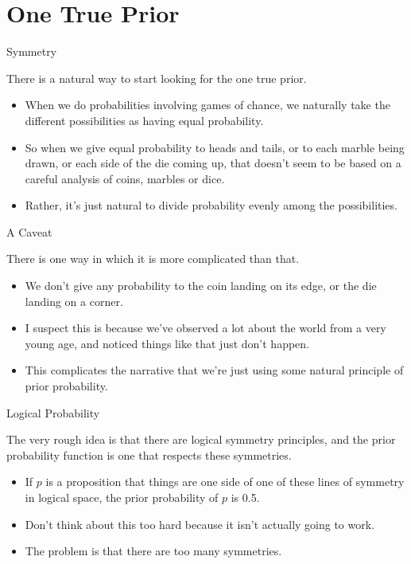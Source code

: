 \documentclass[
  ignorenonframetext,
]{beamer}
\providecommand{\tightlist}{%
  \setlength{\itemsep}{0pt}\setlength{\parskip}{0pt}}
\renewcommand{\,}{\text{, }}
\begin{document}
\hypertarget{one-true-prior-1}{%
\section{One True Prior}\label{one-true-prior-1}}

\begin{frame}{Symmetry}
\protect\hypertarget{symmetry-1}{}

There is a natural way to start looking for the one true prior.

\begin{itemize}
\tightlist
\item
  When we do probabilities involving games of chance, we naturally take
  the different possibilities as having equal probability.
\item
  So when we give equal probability to heads and tails, or to each
  marble being drawn, or each side of the die coming up, that doesn't
  seem to be based on a careful analysis of coins, marbles or dice.
\item
  Rather, it's just natural to divide probability evenly among the
  possibilities.
\end{itemize}

\end{frame}

\begin{frame}{A Caveat}
\protect\hypertarget{a-caveat-1}{}

There is one way in which it is more complicated than that.

\begin{itemize}
\tightlist
\item
  We don't give any probability to the coin landing on its edge, or the
  die landing on a corner.
\item
  I suspect this is because we've observed a lot about the world from a
  very young age, and noticed things like that just don't happen.
\item
  This complicates the narrative that we're just using some natural
  principle of prior probability.
\end{itemize}

\end{frame}

\begin{frame}{Logical Probability}
\protect\hypertarget{logical-probability-1}{}

The very rough idea is that there are logical symmetry principles, and
the prior probability function is one that respects these symmetries.

\begin{itemize}
\tightlist
\item
  If \(p\) is a proposition that things are one side of one of these
  lines of symmetry in logical space, the prior probability of \(p\) is
  0.5. \pause
\item
  Don't think about this too hard because it isn't actually going to
  work.
\item
  The problem is that there are too many symmetries.
\end{itemize}

\end{frame}
\end{document}
